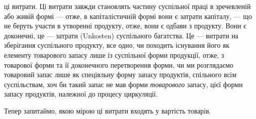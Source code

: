 \parcont{}  %
ці витрати. Ці витрати завжди становлять частину суспільної праці в зречевленій
або живій формі — отже, в капіталістичній формі вони є затрати
капіталу, — що не беруть участи в утворенні продукту, отже, вони є одбави
з продукту. Вони є доконечні, це — затрати (Unkosten) суспільного
багатства. Це — витрати на зберігання суспільного продукту, все одно,
чи походить існування його як елементу товарового запасу лише
із суспільної форми продукції, отже, з товарової форми та її доконечного
перетворення форми, чи ми розглядаємо товаровий запас лише як спеціяльну
форму запасу продуктів, спільного всім суспільствам, хоч би
такий запас не мав форми \emph{товарового} запасу, цієї форми запасу продуктів,
належної до процесу циркуляції.

Тепер запитаймо, якою мірою ці витрати входять у вартість товарів.

